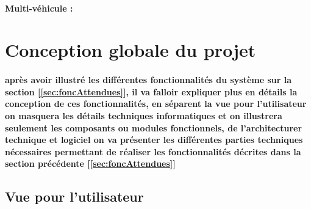 \paragraph{Multi-véhicule :}



\section{Conception globale du projet} \label{sec:conception}
\paragraph{
   après avoir illustré les différentes fonctionnalités du système sur la
section [\ref{sec:foncAttendues}], il va falloir expliquer plus en détails
la conception de ces fonctionnalités, en séparent la vue pour l'utilisateur
on masquera les détails techniques informatiques et on illustrera seulement
les composants ou modules fonctionnels, de l'architecturer technique et
logiciel on va présenter les différentes parties techniques nécessaires
permettant de réaliser les fonctionnalités décrites dans la section
précédente [\ref{sec:foncAttendues}]}

\subsection{Vue pour l’utilisateur} \label{subsec:vueUtil}
   
